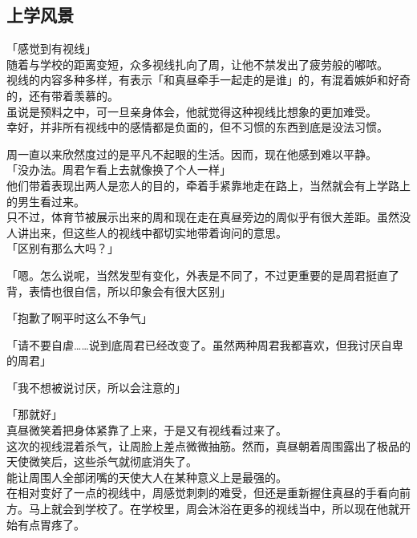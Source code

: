 \subsection{上学风景}

「感觉到有视线」\\

随着与学校的距离变短，众多视线扎向了周，让他不禁发出了疲劳般的嘟哝。\\

视线的内容多种多样，有表示「和真昼牵手一起走的是谁」的，有混着嫉妒和好奇的，还有带着羡慕的。\\

虽说是预料之中，可一旦亲身体会，他就觉得这种视线比想象的更加难受。\\

幸好，并非所有视线中的感情都是负面的，但不习惯的东西到底是没法习惯。

周一直以来欣然度过的是平凡不起眼的生活。因而，现在他感到难以平静。\\

「没办法。周君乍看上去就像换了个人一样」\\

他们带着表现出两人是恋人的目的，牵着手紧靠地走在路上，当然就会有上学路上的男生看过来。\\

只不过，体育节被展示出来的周和现在走在真昼旁边的周似乎有很大差距。虽然没人讲出来，但这些人的视线中都切实地带着询问的意思。\\

「区别有那么大吗？」

「嗯。怎么说呢，当然发型有变化，外表是不同了，不过更重要的是周君挺直了背，表情也很自信，所以印象会有很大区别」

「抱歉了啊平时这么不争气」

「请不要自虐……说到底周君已经改变了。虽然两种周君我都喜欢，但我讨厌自卑的周君」

「我不想被说讨厌，所以会注意的」

「那就好」\\

真昼微笑着把身体紧靠了上来，于是又有视线看过来了。\\

这次的视线混着杀气，让周脸上差点微微抽筋。然而，真昼朝着周围露出了极品的天使微笑后，这些杀气就彻底消失了。\\

能让周围人全部闭嘴的天使大人在某种意义上是最强的。\\

在相对变好了一点的视线中，周感觉刺刺的难受，但还是重新握住真昼的手看向前方。马上就会到学校了。在学校里，周会沐浴在更多的视线当中，所以现在他就开始有点胃疼了。\\


